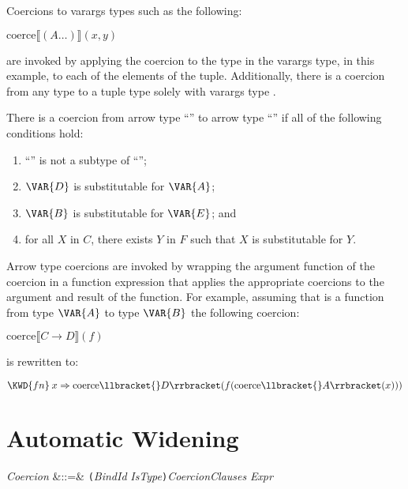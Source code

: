 Coercions to varargs types such as the following:
\begin{Fortress}
\(\mathrm{coerce}\llbracket(A\ldots)\rrbracket(x, y)\)
\end{Fortress}
are invoked by applying the coercion to the type in the varargs type,
 in this example, to each of the elements of the tuple.
Additionally, there is a coercion from any type  to a tuple type
solely with varargs type .



There is a coercion from arrow type
``'' to arrow type
``'' if all of the following
conditions hold:
\begin{enumerate}
\item ``'' is not a subtype of
``'';
\item
$\VAR{D}$ is substitutable for $\VAR{A}$;
\item
$\VAR{B}$ is substitutable for $\VAR{E}$; and
\item for all $X$ in $C$, there exists $Y$ in $F$ such that $X$ is
 substitutable for $Y$.
\end{enumerate}

Arrow type coercions are invoked by wrapping the argument function of the
coercion in a function expression that applies the appropriate
coercions to the argument and result of the function.  For example,
assuming that  is a function from type $\VAR{A}$ to type
$\VAR{B}$ the following coercion:
\begin{Fortress}
\(\mathrm{coerce}\llbracket{}C \rightarrow D\rrbracket(f)\)
\end{Fortress}
is rewritten to:
\begin{Fortress}
\(\KWD{fn}\:x \Rightarrow \mathrm{coerce}\llbracket{}D\rrbracket(f(\mathrm{coerce}\llbracket{}A\rrbracket(x)))\)
\end{Fortress}


\section{Automatic Widening}

\begin{Grammar}
\emph{Coercion} &::=&
\texttt(\emph{BindId} \emph{IsType}\texttt)\emph{CoercionClauses}  \EXP{=} \emph{Expr}\\

\end{Grammar}


